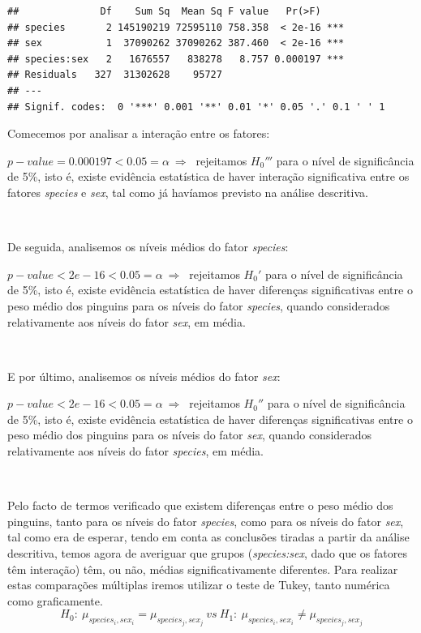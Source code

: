 \documentclass[]{article}
\begin{document}
\begin{Shaded}
\begin{Highlighting}[]
\end{Highlighting}
\end{Shaded}

\begin{verbatim}
##              Df    Sum Sq  Mean Sq F value   Pr(>F)    
## species       2 145190219 72595110 758.358  < 2e-16 ***
## sex           1  37090262 37090262 387.460  < 2e-16 ***
## species:sex   2   1676557   838278   8.757 0.000197 ***
## Residuals   327  31302628    95727                     
## ---
## Signif. codes:  0 '***' 0.001 '**' 0.01 '*' 0.05 '.' 0.1 ' ' 1
\end{verbatim}

Comecemos por analisar a interação entre os fatores:

\(p-value = 0.000197 < 0.05 = \alpha\ \Rightarrow\ \) rejeitamos
\(H_0'''\) para o nível de significância de 5\%, isto é, existe
evidência estatística de haver interação significativa entre os fatores
\emph{species} e \emph{sex}, tal como já havíamos previsto na análise
descritiva.

\(\ \)

De seguida, analisemos os níveis médios do fator \emph{species}:

\(p-value < 2e-16 < 0.05 = \alpha\ \Rightarrow\ \) rejeitamos \(H_0'\)
para o nível de significância de 5\%, isto é, existe evidência
estatística de haver diferenças significativas entre o peso médio dos
pinguins para os níveis do fator \emph{species}, quando considerados
relativamente aos níveis do fator \emph{sex}, em média.

\(\ \)

E por último, analisemos os níveis médios do fator \emph{sex}:

\(p-value < 2e-16 < 0.05 = \alpha\ \Rightarrow\ \) rejeitamos \(H_0''\)
para o nível de significância de 5\%, isto é, existe evidência
estatística de haver diferenças significativas entre o peso médio dos
pinguins para os níveis do fator \emph{sex}, quando considerados
relativamente aos níveis do fator \emph{species}, em média.

\(\ \)

Pelo facto de termos verificado que existem diferenças entre o peso
médio dos pinguins, tanto para os níveis do fator \emph{species}, como
para os níveis do fator \emph{sex}, tal como era de esperar, tendo em
conta as conclusões tiradas a partir da análise descritiva, temos agora
de averiguar que grupos (\emph{species:sex}, dado que os fatores têm
interação) têm, ou não, médias significativamente diferentes. Para
realizar estas comparações múltiplas iremos utilizar o teste de Tukey,
tanto numérica como graficamente. \[
H_0:\ \mu_{species_i,sex_i}=\mu_{species_j,sex_j}\
vs\
H_1:\ \mu_{species_i,sex_i}\neq\mu_{species_j,sex_j}
\]
\end{document}
